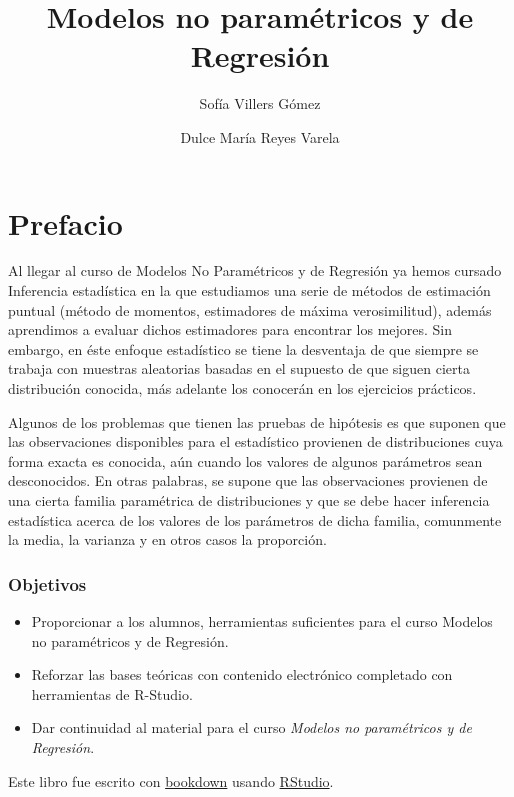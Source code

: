 \documentclass[
  a4paper,
  oneside,
  openany]{book}
\title{Modelos no paramétricos y de Regresión}
\author{Sofía Villers Gómez \and Dulce María Reyes Varela}
\date{}
\begin{document}
\maketitle

{
\setcounter{tocdepth}{2}
\tableofcontents
}
\hypertarget{prefacio}{%
\chapter*{Prefacio}\label{prefacio}}


Al llegar al curso de Modelos No Paramétricos y de Regresión ya hemos cursado Inferencia estadística en la que estudiamos una serie de métodos de estimación puntual (método de momentos, estimadores de máxima verosimilitud), además aprendimos a evaluar dichos estimadores para encontrar los mejores. Sin embargo, en éste enfoque estadístico se tiene la desventaja de que siempre se trabaja con muestras aleatorias basadas en el supuesto de que siguen cierta distribución conocida, más adelante los conocerán en los ejercicios prácticos.

Algunos de los problemas que tienen las pruebas de hipótesis es que suponen que las observaciones disponibles para el estadístico provienen de distribuciones cuya forma exacta es conocida, aún cuando los valores de algunos parámetros sean desconocidos. En otras palabras, se supone que las observaciones provienen de una cierta familia paramétrica de distribuciones y que se debe hacer inferencia estadística acerca de los valores de los parámetros de dicha familia, comunmente la media, la varianza y en otros casos la proporción.

\hypertarget{objetivos}{%
\subsection*{Objetivos}\label{objetivos}}


\begin{itemize}
\item
  Proporcionar a los alumnos, herramientas suficientes para el curso Modelos no paramétricos y de Regresión.
\item
  Reforzar las bases teóricas con contenido electrónico completado con herramientas de R-Studio.
\item
  Dar continuidad al material para el curso \emph{Modelos no paramétricos y de Regresión}.
\end{itemize}

Este libro fue escrito con \href{http://bookdown.org/}{bookdown} usando \href{http://www.rstudio.com/ide/}{RStudio}.
\end{document}
